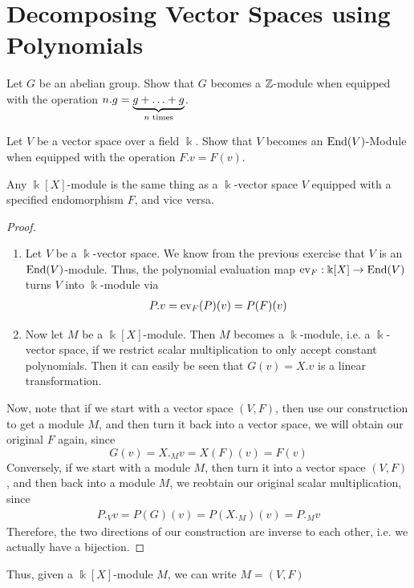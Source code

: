 \section{Decomposing Vector Spaces using Polynomials}
\begin{exercise}
	Let $G$ be an abelian group. Show that $G$ becomes a $\mathbb{Z}$-module when equipped with the operation $n.g = \underbrace{g + \hdots + g}_{n \textnormal{ times}}$.
\end{exercise}
\begin{exercise}
	Let $V$ be a vector space over a field $\Bbbk$. Show that $V$ becomes an $\textnormal{End}(V)$-Module when equipped with the operation $F.v = F(v)$.
\end{exercise}
\begin{theorem}
	Any $\Bbbk[X]$-module is the same thing as a $\Bbbk$-vector space $V$ equipped with a specified endomorphism $F$, and vice versa.
\end{theorem}
\begin{proof}
	\begin{enumerate}
		\item Let $V$ be a $\Bbbk$-vector space. We know from the previous exercise that $V$ is an $\textnormal{End}(V)$-module. Thus, the polynomial evaluation map $\operatorname{ev}_F : \Bbbk[X] \to \textnormal{End}(V)$ turns $V$ into $\Bbbk$-module via
		\begin{align*}
			P.v = \operatorname{ev}_F(P)(v) = P(F)(v)
		\end{align*}
		\item Now let $M$ be a $\Bbbk[X]$-module. Then $M$ becomes a $\Bbbk$-module, i.e. a $\Bbbk$-vector space, if we restrict scalar multiplication to only accept constant polynomials. Then it can easily be seen that $G(v) = X.v$ is a linear transformation.
	\end{enumerate}
	\newpar
	Now, note that if we start with a vector space $(V,F)$, then use our construction to get a module $M$, and then turn it back into a vector space, we will obtain our original $F$ again, since $$G(v) = X._Mv = X(F)(v) = F(v)$$ 
	Conversely, if we start with a module $M$, then turn it into a vector space $(V,F)$, and then back into a module $M$, we reobtain our original scalar multiplication, since 
	\begin{align*}
		P._Vv = P(G)(v) = P(X._M)(v) = P._Mv
	\end{align*}
	Therefore, the two directions of our construction are inverse to each other, i.e. we actually have a bijection.
\end{proof}
Thus, given a $\Bbbk[X]$-module $M$, we can write $M = (V,F)$

